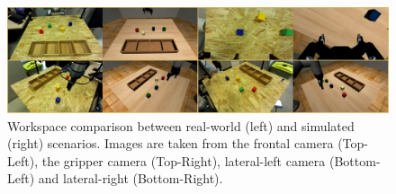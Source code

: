 \begin{figure}[t]
    \centering
    \includegraphics[width=1.0\textwidth]{figures/images/ch5/workspace.jpg}
    \caption{Workspace comparison between real-world (left) and simulated (right) scenarios. Images are taken from the frontal camera (Top-Left), the gripper camera (Top-Right), lateral-left camera (Bottom-Left) and lateral-right (Bottom-Right).}
    \label{fig:workspace}
\end{figure}
